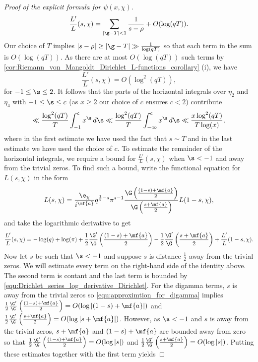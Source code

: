 \begin{proof}[Proof of the explicit formula for $\psi(x,\chi)$]
        \[
          \frac{L'}{L}(s,\chi) = \sum_{|\g-T| < 1}\frac{1}{s-\rho}+O(\log(qT)).
        \]
        Our choice of $T$ implies $|s-\rho| \ge |\g-T| \gg \frac{1}{\log(qT)}$ so that each term in the sum is $O(\log(qT))$. As there are at most $O(\log(qT))$ such terms by \cref{cor:Riemann_von_Mangoldt_Dirichlet_L-functions_corollary} (i), we have
        \[
          \frac{L'}{L}(s,\chi) = O(\log^{2}(qT)),
        \]
        for $-1 \le \s \le 2$. It follows that the parts of the horizontal integrals over $\eta_{2}$ and $\eta_{4}$ with  $-1 \le \s \le c$ (as $x \ge 2$ our choice of $c$ ensures $c < 2$) contribute
        \begin{equation}\label{equ:explicit_formula_Dirichlet_proof_8}
          \ll \frac{\log^{2}(qT)}{T}\int_{-1}^{c}x^{\s}\,d\s \ll \frac{\log^{2}(qT)}{T}\int_{-\infty}^{c}x^{\s}\,d\s \ll \frac{x\log^{2}(qT)}{T\log(x)},
        \end{equation}
        where in the first estimate we have used the fact that $s \sim T$ and in the last estimate we have used the choice of $c$. To estimate the remainder of the horizontal integrals, we require a bound for $\frac{L'}{L}(s,\chi)$ when $\s < -1$ and away from the trivial zeros. To find such a bound, write the functional equation for $L(s,\chi)$ in the form
        \[
          L(s,\chi) = \frac{\e_{\chi}}{i^{\mf{a}}}q^{\frac{1}{2}-s}\pi^{s-1}\frac{\G\left(\frac{(1-s)+\mf{a}}{2}\right)}{\G\left(\frac{s+\mf{a}}{2}\right)}L(1-s,\chi),
        \]
        and take the logarithmic derivative to get
        \[
          \frac{L'}{L}(s,\chi) = -\log(q)+\log(\pi)+\frac{1}{2}\frac{\G'}{\G}\left(\frac{(1-s)+\mf{a}}{2}\right)-\frac{1}{2}\frac{\G'}{\G}\left(\frac{s+\mf{a}}{2}\right)+\frac{L'}{L}(1-s,\chi).
        \]
        Now let $s$ be such that $\s < -1$ and suppose $s$ is distance $\frac{1}{2}$ away from the trivial zeros. We will estimate every term on the right-hand side of the identity above. The second term is contant and the last term is bounded by \cref{equ:Drichlet_series_log_derivative_Dirichlet}. For the digamma terms, $s$ is away from the trivial zeros so \cref{equ:approximtion_for_digamma} implies $\frac{1}{2}\frac{\G'}{\G}\left(\frac{(1-s)+\mf{a}}{2}\right) = O(\log|(1-s)+\mf{a}|)$ and $\frac{1}{2}\frac{\G'}{\G}\left(\frac{s+\mf{a}}{2}\right) = O(\log|s+\mf{a}|)$. However, as $\s < -1$ and $s$ is away from the trivial zeros, $s+\mf{a}$ and $(1-s)+\mf{a}$ are bounded away from zero so that $\frac{1}{2}\frac{\G'}{\G}\left(\frac{(1-s)+\mf{a}}{2}\right) = O(\log|s|)$ and $\frac{1}{2}\frac{\G'}{\G}\left(\frac{s+\mf{a}}{2}\right) = O(\log|s|)$. Putting these estimates together with the first term yields

\end{proof}
